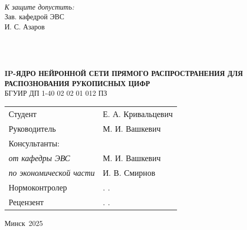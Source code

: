 \newcommand{\targetYear}{2025}

\newcommand{\studentFull}{Е. А. Кривальцевич}
\newcommand{\tutorFull}{М. И. Вашкевич}
\newcommand{\headOfDepartment}{И. С. Азаров}
\newcommand{\consultDepart}{М. И. Вашкевич}
\newcommand{\consultEconom}{И. В. Смирнов}
\newcommand{\normInspect}{. . }
\newcommand{\recnspect}{. . }
\newcommand{\taskNameFull}{IP-ЯДРО НЕЙРОННОЙ СЕТИ ПРЯМОГО РАСПРОСТРАНЕНИЯ ДЛЯ РАСПОЗНОВАНИЯ РУКОПИСНЫХ ЦИФР}
\newcommand{\docNumber}{БГУИР ДП 1-40 02 02 01 012 ПЗ}
\newcommand{\city}{Минск}


\begin{center}
  \\
  \\
  \\
  \\[2em]

  \\
  \\[1.5em]

  \begin{flushright}
    \textit{К защите допустить:}\\
    Зав. кафедрой ЭВС\\[0.5em]
    \underline{\hspace*{3cm}} \headOfDepartment
  \end{flushright}

  \vfill

  \\
  \\
  \\[1em]
  \textbf{\MakeUppercase{\taskNameFull}}\\[1em]

  \docNumber\\[1em]

  \begin{flushleft}
    \begin{tabular}{ p{} p{} }
      Студент & \studentFull \\[1em]
      Руководитель & \tutorFull \\[1em]
      Консультанты: & \\[0.5em]
      \hspace{0.75cm} \textit{от кафедры ЭВС} & \consultDepart \\[1em]
      \hspace{0.75cm} \textit{по экономической части} & \consultEconom \\[1em]
      Нормоконтролер & \normInspect \\[1em]
      Рецензент & \recnspect \\[1em]
    \end{tabular}
  \end{flushleft}

  \vfill
  {\city~\targetYear}
\end{center}


